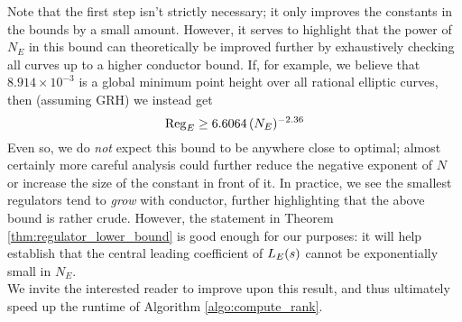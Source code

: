 Note that the first step isn't strictly necessary; it only improves the constants in the bounds by a small amount. However, it serves to highlight that the power of $N_E$ in this bound can theoretically be improved further by exhaustively checking all curves up to a higher conductor bound. If, for example, we believe that $8.914\times 10^{-3}$ is a global minimum point height over all rational elliptic curves, then (assuming GRH) we instead get
\begin{equation}
\operatorname{Reg}_E \ge 6.6064 \, (N_E)^{-2.36}
\end{equation}
Even so, we do {\it not} expect this bound to be anywhere close to optimal; almost certainly more careful analysis could further reduce the negative exponent of $N$ or increase the size of the constant in front of it. In practice, we see the smallest regulators tend to {\it grow} with conductor, further highlighting that the above bound is rather crude. However, the statement in Theorem \ref{thm:regulator_lower_bound} is good enough for our purposes: it will help establish that the central leading coefficient of $L_E(s)$ cannot be exponentially small in $N_E$. \\

We invite the interested reader to improve upon this result, and thus ultimately speed up the runtime of Algorithm \ref{algo:compute_rank}. 